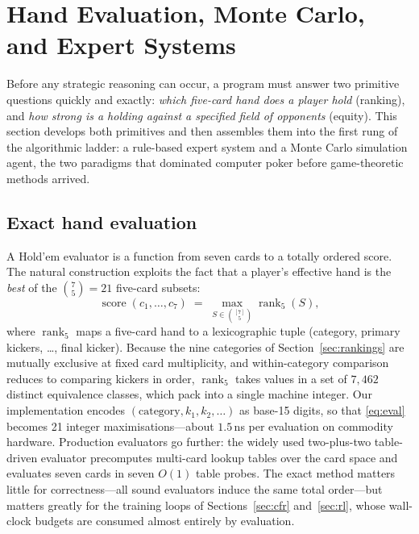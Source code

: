 \section{Hand Evaluation, Monte Carlo, and Expert Systems}\label{sec:evaluation}

Before any strategic reasoning can occur, a program must answer two primitive questions quickly and exactly: \emph{which five-card hand does a player hold} (ranking), and \emph{how strong is a holding against a specified field of opponents} (equity). This section develops both primitives and then assembles them into the first rung of the algorithmic ladder: a rule-based expert system and a Monte Carlo simulation agent, the two paradigms that dominated computer poker before game-theoretic methods arrived.

\subsection{Exact hand evaluation}

A Hold'em evaluator is a function from seven cards to a totally ordered score. The natural construction exploits the fact that a player's effective hand is the \emph{best} of the $\binom{7}{5}=21$ five-card subsets:
\begin{equation}\label{eq:eval}
\operatorname{score}(c_1,\dots,c_7) \;=\; \max_{S \in \binom{[7]}{5}} \operatorname{rank}_5(S),
\end{equation}
where $\operatorname{rank}_5$ maps a five-card hand to a lexicographic tuple (category, primary kickers, \dots, final kicker). Because the nine categories of Section~\ref{sec:rankings} are mutually exclusive at fixed card multiplicity, and within-category comparison reduces to comparing kickers in order, $\operatorname{rank}_5$ takes values in a set of $7{,}462$ distinct equivalence classes, which pack into a single machine integer. Our implementation encodes $(\text{category}, k_1, k_2, \dots)$ as base-15 digits, so that \eqref{eq:eval} becomes 21 integer maximisations---about $1.5$\,ns per evaluation on commodity hardware. Production evaluators go further: the widely used two-plus-two table-driven evaluator precomputes multi-card lookup tables over the card space and evaluates seven cards in seven $O(1)$ table probes. The exact method matters little for correctness---all sound evaluators induce the same total order---but matters greatly for the training loops of Sections~\ref{sec:cfr} and~\ref{sec:rl}, whose wall-clock budgets are consumed almost entirely by evaluation.

